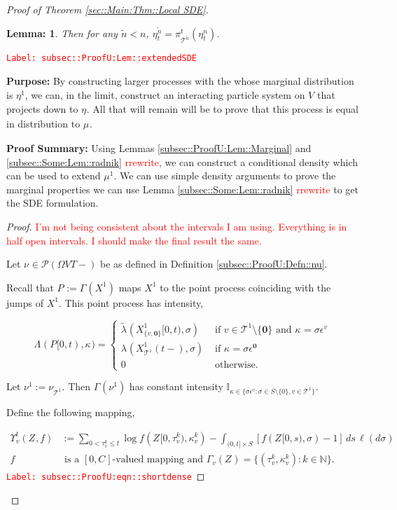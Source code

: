 \documentclass[12pt]{article}
\newcommand{\mb}{\mathbb}
\newcommand{\mc}{\mathcal}
\newcommand{\te}{\text}
\newcommand{\ep}{\epsilon}
\newcommand{\tr}{\textcolor{red}}
\newcommand{\labe}[1]{\tr{\texttt{Label: #1}}}
\newcommand{\purpose}{\textbf{Purpose: }}
\newcommand{\pfsum}{\textbf{Proof Summary: }}
\newcommand{\ind}{\hspace{24pt}}
\newcommand{\defeq}{:=}								%
\newcommand{\pmsr}{\mc{P}}							%
\renewcommand{\root}{\mathbf{0}}				%
\renewcommand{\v}{v}							%
\renewcommand{\S}{S}							%
\newcommand{\s}{\sigma}							%
\newcommand{\ev}[1]{\ep^{#1}}					%
\newcommand{\T}{T}								%
\renewcommand{\t}{t}							%
\renewcommand{\tt}{s}							%
\newcommand{\pup}[1]{^{#1}}							%
\newcommand{\tree}{\mc{T}}							%
\newcommand{\V}{V}									%
\newcommand{\rt}[1]{\tau^{#1}}						%
\renewcommand{\it}{k}								%
\newcommand{\numb}{n}								%
\newcommand{\piV}[2]{\pi_{#1}^{#2}}					%
\newcommand{\rxvtn}[3]{X_{#1}^{#3}(#2)}				%
\newcommand{\rxvtsn}[3]{X_{#1}^{#3}{#2}}			%
\newcommand{\rxvttts}[2]{Z_{#1}{#2}}				%
\newcommand{\rp}[1]{P^{#1}}							%
\newcommand{\m}[3]{\mu_{#2#1}^{#3}}						%
\newcommand{\mm}[3]{\nu_{#2#1}^{#3}}						%
\newcommand{\mmm}[3]{\eta_{#2#1}^{#3}}						%
\newcommand{\rate}[1]{\lambda_{#1}}					%
\newcommand{\ratee}[1]{\Lambda_{#1}}				%
\newcommand{\crate}[2]{\alt{\lambda}_{#1}^{#2}}		%
\newcommand{\const}[1]{C_{#1}}						%
\newcommand{\Sm}{\ell}								%
\newcommand{\alt}{\widetilde}						%
\renewcommand{\mark}[1]{\kappa^{#1}}				%
\newcommand{\ds}[2]{\Upsilon_{#1}^{#2}}			%
\newcommand{\pmap}[1]{\Gamma_{#1}}				%
\newtheorem{lem}[thms]{Lemma: }
\begin{document}
\begin{proof}[Proof of Theorem \ref{sec::Main:Thm::Local SDE}]
\begin{lem}
Then for any \(\alt{\numb} < \numb\), \(\mmm{}{\t}{\alt{\numb}} = \piV{\tree\pup{\alt{\numb}}}{\t}(\mmm{}{\t}{\numb})\).
\label{subsec::ProofU:Lem::extendedSDE}
\end{lem}
\labe{subsec::ProofU:Lem::extendedSDE}

\purpose By constructing larger processes with the whose marginal distribution is \(\mmm{}{}{1}\), we can, in the limit, construct an interacting particle system on \(V\) that projects down to \(\mmm{}{}{}\). All that will remain will be to prove that this process is equal in distribution to \(\m{}{}{}\).

\pfsum Using Lemmas \ref{subsec::ProofU:Lem::Marginal} and \ref{subsec::Some:Lem::radnik} \tr{rrewrite}, we can construct a conditional density which can be used to extend \(\mu\pup{1}\). We can use simple density arguments to prove the marginal properties we can use Lemma \ref{subsec::Some:Lem::radnik} \tr{rrewrite} to get the SDE formulation.

\begin{proof}
\tr{I'm not being consistent about the intervals I am using. Everything is in half open intervals. I should make the final result the same.}

Let \(\mm{}{}{} \in \pmsr(\Omega{\V}{\T-})\) be as defined in Definition \ref{subsec::ProofU:Defn::nu}.

\ind Recall that \(\rp{} \defeq \pmap{}(\rxvtsn{}{}{1})\) maps \(\rxvtsn{}{}{1}\) to the point process coinciding with the jumps of \(\rxvtsn{}{}{1}\). This point process has intensity,

\[\ratee{}(\rp{}[0,\t),\mark{}) = \begin{cases}
\crate{}{}(\rxvtsn{\{\v,\root\}}{[0,\t)}{1},\s) &\te{ if } \v\in \tree\pup{1}\setminus\{\root\}\te{ and } \mark{} = \s\ev{\v}\\
\rate{}(\rxvtn{\tree\pup{1}}{\t-}{1},\s) &\te{ if } \mark{} = \s\ev{\root}\\
0 &\te{ otherwise}.
\end{cases}\]

Let \(\mm{}{}{1} \defeq \mm{\tree\pup{1}}{}{}\). Then \(\pmap{}(\mm{}{}{1})\) has constant intensity \(\mb{I}_{\kappa \in\{\s\ev{\v}:\s\in\S\setminus\{0\},\v\in\tree\pup{1}\}}\). 

\ind Define the following mapping,

\begin{align}
\ds{\v}{\t}(\rxvttts{}{},f) &\defeq \sum_{0 < \rt{\it}_\v \leq \t} \log{f(\rxvttts{}{[0,\rt{\it}_\v)},\mark{\it}_\v)} - \int_{(0,\t]\times \S} [f(\rxvttts{}{[0,\tt)},\s) - 1]\,ds\,\Sm(d\s) \label{subsec::ProofU:eqn::shortdense}\\
f&\te{ is a }[0,\const{}] \te{-valued mapping and } \pmap{\v}(\rxvttts{}{}) = \{(\rt{\it}_\v,\mark{\it}_\v):\it\in\mb{N}\}.\nonumber
\end{align} 
\labe{subsec::ProofU:eqn::shortdense}


\end{proof}
\end{proof}
\end{document}
